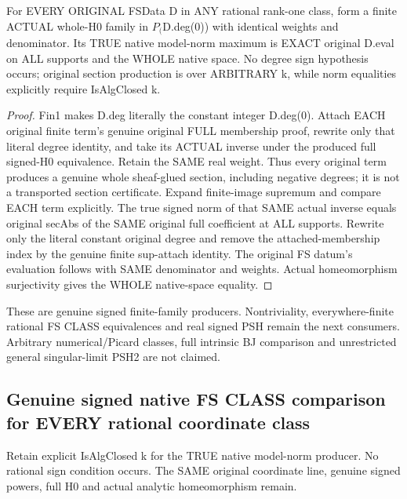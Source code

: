 \begin{theorem}
\label{thm:seven-original-fs-native-signed-family-dictionary}
\leanok
For EVERY ORIGINAL FSData D in ANY rational rank-one class, form a
finite ACTUAL whole-H0 family in $P_($D.deg(0)) with identical weights
and denominator. Its TRUE native model-norm maximum is EXACT original
D.eval on ALL supports and the WHOLE native space. No degree sign
hypothesis occurs; original section production is over ARBITRARY k,
while norm equalities explicitly require IsAlgClosed k.
\end{theorem}
\begin{proof}
Fin1 makes D.deg literally the constant integer D.deg(0). Attach EACH
original finite term's genuine original FULL membership proof, rewrite
only that literal degree identity, and take its ACTUAL inverse under
the produced full signed-H0 equivalence. Retain the SAME real weight.
Thus every original term produces a genuine whole sheaf-glued section,
including negative degrees; it is not a transported section certificate.
Expand finite-image supremum and compare EACH term explicitly. The
true signed norm of that SAME actual inverse equals original secAbs
of the SAME original full coefficient at ALL supports. Rewrite only
the literal constant original degree and remove the attached-membership
index by the genuine finite sup-attach identity. The original FS datum's
evaluation follows with SAME denominator and weights. Actual homeomorphism
surjectivity gives the WHOLE native-space equality.
\end{proof}

These are genuine signed finite-family producers. Nontriviality,
everywhere-finite rational FS CLASS equivalences and real signed PSH
remain the next consumers. Arbitrary numerical/Picard classes, full
intrinsic BJ comparison and unrestricted general singular-limit PSH2
are not claimed.

\subsection{Genuine signed native FS CLASS comparison for EVERY rational coordinate class}
Retain explicit IsAlgClosed k for the TRUE native model-norm producer.
No rational sign condition occurs. The SAME original coordinate line,
genuine signed powers, full H0 and actual analytic homeomorphism remain.

